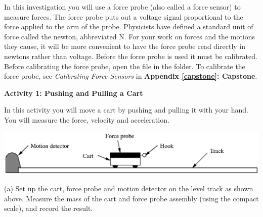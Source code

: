 In this investigation you will use a force probe (also called a force sensor) to measure forces. The force probe puts out a voltage signal proportional to the force applied to the arm of the probe. Physicists have defined a standard unit of force called the newton, abbreviated N. For your work on forces and the motions they cause, it will be more convenient to have the force probe read directly in newtons rather than voltage. Before the force probe is used it must be calibrated. Before calibrating the force probe, open the 
 file in the \filename{\coursefolder} folder.
To calibrate the force probe, see \textit{Calibrating Force Sensors} in \textbf{Appendix \ref{capstone}: Capstone}.

%

\textbf{Activity 1: Pushing and Pulling a Cart} 

In this activity you will move a cart by pushing and pulling it with your hand.
You will measure the force, velocity and acceleration. 

\vspace{-0.2cm}
{\par\centering \includegraphics{force1/force1_fig1.eps} \par}

(a) Set up the cart, force probe and motion detector on the level track as shown above. 
Measure the mass of the cart and force probe assembly (using the compact scale), and record the result.
\answerspace{10mm}




